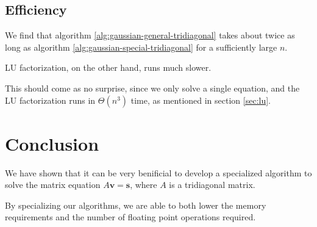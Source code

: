 \documentclass[a4paper]{article}
\begin{document}
\subsection{Efficiency}
We find that algorithm \ref{alg:gaussian-general-tridiagonal} takes about twice as long as algorithm \ref{alg:gaussian-special-tridiagonal} for a sufficiently large $n$.

LU factorization, on the other hand, runs much slower.



This should come as no surprise, since we only solve a single equation, and the LU factorization runs in $\Theta (n^3)$ time, as mentioned in section \ref{sec:lu}.

\section{Conclusion}\label{sec:conclusion}
We have shown that it can be very benificial to develop a specialized algorithm to solve the matrix equation $A\mathbf{v} = \mathbf{s}$, where $A$ is a tridiagonal matrix.

By specializing our algorithms, we are able to both lower the memory requirements and the number of floating point operations required.

%
%

{}
\end{document}

